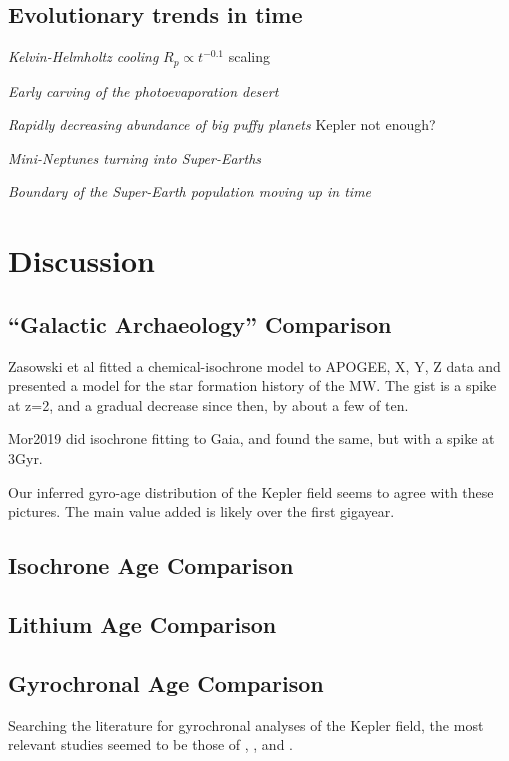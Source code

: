 \documentclass[11pt,twocolumn,tighten]{aastex63}
\begin{document}
\subsection{Evolutionary trends in time}

{\it Kelvin-Helmholtz cooling}
$R_p \propto t^{-0.1}$ scaling \citep{Gupta_2019}

{\it Early carving of the photoevaporation desert}
\citep{Owen_Lai_2018}

{\it Rapidly decreasing abundance of big puffy planets}
Kepler not enough?

{\it Mini-Neptunes turning into Super-Earths}
\citep[e.g.][]{Rogers_2021}

{\it Boundary of the Super-Earth population moving up in time}
\citep{David_2021}


\section{Discussion}
\label{sec:disc}

\subsection{``Galactic Archaeology'' Comparison}
Zasowski et al fitted a chemical-isochrone model to APOGEE, X, Y, Z
data and presented a model for the star formation history of the MW.
The gist is a spike at z=2, and a gradual decrease since then, by
about a few of ten.

Mor2019 did isochrone fitting to Gaia, and found the same, but with a
spike at 3Gyr.

Our inferred gyro-age distribution of the Kepler field seems to agree
with these pictures.  The main value added is likely over the first
gigayear.

\subsection{Isochrone Age Comparison}

\subsection{Lithium Age Comparison}

\subsection{Gyrochronal Age Comparison}
Searching the literature for gyrochronal analyses of the Kepler field,
the most relevant studies seemed to be those of
\citet{Walkowicz_2013}, \citet{Reinhold_2015}, and 
\citet{David_2021}.
\end{document}

